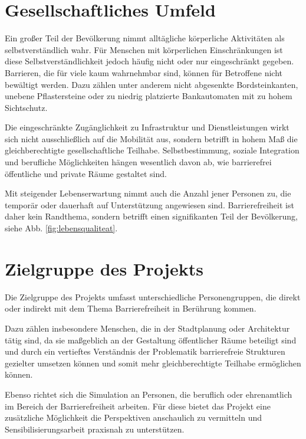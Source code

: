 
\section{Gesellschaftliches Umfeld}
Ein großer Teil der Bevölkerung nimmt alltägliche körperliche Aktivitäten als selbstverständlich wahr. Für Menschen mit körperlichen Einschränkungen ist diese Selbstverständlichkeit jedoch häufig nicht oder nur eingeschränkt gegeben. Barrieren, die für viele kaum wahrnehmbar sind, können für Betroffene nicht bewältigt werden. Dazu zählen unter anderem nicht abgesenkte Bordsteinkanten, unebene Pflastersteine oder zu niedrig platzierte Bankautomaten mit zu hohem Sichtschutz.

Die eingeschränkte Zugänglichkeit zu Infrastruktur und Dienstleistungen wirkt sich nicht ausschließlich auf  die Mobilität aus, sondern betrifft in hohem Maß die gleichberechtigte gesellschaftliche Teilhabe.  Selbstbestimmung, soziale Integration und berufliche Möglichkeiten hängen wesentlich davon ab, wie  barrierefrei öffentliche und private Räume gestaltet sind.

Mit steigender Lebenserwartung nimmt auch die Anzahl jener Personen zu, die temporär oder dauerhaft auf  Unterstützung angewiesen sind. Barrierefreiheit ist daher kein Randthema, sondern betrifft einen signifikanten Teil der Bevölkerung, siehe Abb. \ref{fig:lebensqualiteat}.

\section{Zielgruppe des Projekts}

Die Zielgruppe des Projekts umfasst unterschiedliche Personengruppen, die direkt oder indirekt mit dem Thema 
Barrierefreiheit in Berührung kommen. 

Dazu zählen insbesondere Menschen, die in der Stadtplanung oder 
Architektur tätig sind, da sie maßgeblich an der Gestaltung öffentlicher Räume beteiligt sind und durch ein 
vertieftes Verständnis der Problematik barrierefreie Strukturen gezielter umsetzen können und somit mehr 
gleichberechtigte Teilhabe ermöglichen können.

Ebenso richtet sich die Simulation an Personen, die beruflich oder ehrenamtlich im Bereich der 
Barrierefreiheit arbeiten. Für diese bietet das Projekt eine zusätzliche Möglichkeit die Perspektiven 
anschaulich zu vermitteln und Sensibilisierungsarbeit praxisnah zu unterstützen.

